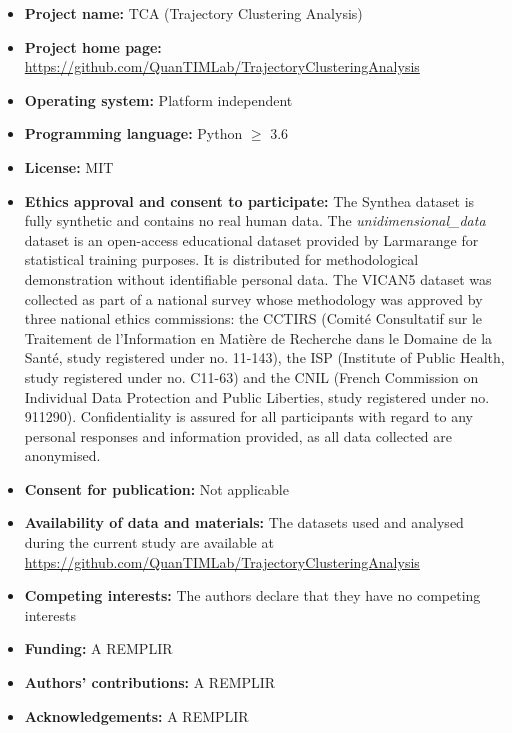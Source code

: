 \documentclass[pdflatex,sn-mathphys-num,referee,lineno]{sn-jnl}
\begin{document}
\begin{itemize}
  \item \textbf{Project name:} TCA (Trajectory Clustering Analysis)
  \item \textbf{Project home page:} \url{https://github.com/QuanTIMLab/TrajectoryClusteringAnalysis}
  \item \textbf{Operating system:} Platform independent
  \item \textbf{Programming language:} Python $\geq$ 3.6
  \item \textbf{License:} MIT
\end{itemize}

\begin{itemize}
  \item \textbf{Ethics approval and consent to participate:} The Synthea \citep{walonoski2020synthea} dataset is fully synthetic and contains no real human data.
  The \textit{unidimensional\_data} dataset is an open-access educational dataset provided by Larmarange \citep{larmarange_analyseR} for statistical training purposes. It is distributed for methodological demonstration without identifiable personal data.
  The VICAN5 \citep{Bouhnike005971} dataset was collected as part of a national survey whose methodology was approved by three national ethics commissions: 
  the CCTIRS (Comité Consultatif sur le Traitement de l’Information en Matière de Recherche dans le Domaine de la Santé, study registered under no. 11-143), 
  the ISP (Institute of Public Health, study registered under no. C11-63) 
  and the CNIL (French Commission on Individual Data Protection and Public Liberties, study registered under no. 911290). 
  Confidentiality is assured for all participants with regard to any personal responses and information provided, as all data collected are anonymised.
  \item \textbf{Consent for publication:} Not applicable
  \item \textbf{Availability of data and materials:} The datasets used and analysed during the current study are available at \url{https://github.com/QuanTIMLab/TrajectoryClusteringAnalysis}
  \item \textbf{Competing interests:} The authors declare that they have no competing interests
  \item \textbf{Funding:} A REMPLIR
  \item \textbf{Authors' contributions:} A REMPLIR
  \item \textbf{Acknowledgements:} A REMPLIR
\end{itemize}


\end{document}
